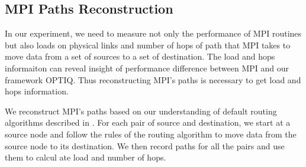 \subsection{MPI Paths Reconstruction}

In our experiment, we need to measure not only the performance of MPI routines but also loads on physical links and number of hops of path that MPI takes to move data from a set of sources to a set of destination. The load and hops informaiton can reveal insight of performance difference between MPI and our framework OPTIQ. Thus reconstructing MPI's paths is necessary to get load and hops information.

We reconstruct MPI's paths based on our understanding of default routing algorithms described in \cite{Chen:BGQ}. For each pair of source and destination, we start at a source node and follow the rules of the routing algorithm to move data from the source node to its destination. We then record paths for all the pairs and use them to calcul
ate load and number of hops.
